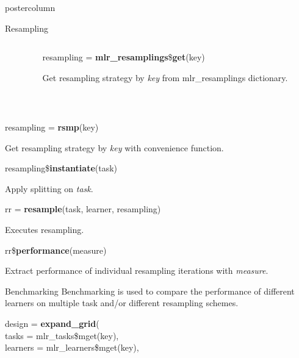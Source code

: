 \documentclass{beamer}
\begin{document}
\begin{frame}[fragile]{}
\begin{columns}
\begin{column}{.245\textwidth}
\begin{beamercolorbox}[center]{postercolumn}
\begin{minipage}{.98\textwidth}
{\begin{myblock}{Resampling}
\begin{minipage}{\textwidth}
\begin{columns}[T]
\begin{column}{0.2\textwidth}
								    \end{column}
								    \begin{column}{0.8\textwidth}
										  \begin{codebox}
										    resampling = \textbf{mlr\_resamplings}\$\textbf{get}(key)
										  \end{codebox}
										  Get resampling strategy by \textit{key} from mlr\_resamplings dictionary.
								    \end{column}
							     \end{columns}
					      	\end{minipage}
						      \\[\baselineskip]
						      \begin{codebox}
						      	resampling = \textbf{rsmp}(key)
						      \end{codebox}
						      Get resampling strategy by \textit{key} with convenience function.
						      \\
						      \begin{codebox}
							      resampling\$\textbf{instantiate}(task)
						      \end{codebox}
						      Apply splitting on \textit{task}.
						      \\
					      	\begin{codebox}
							      rr = \textbf{resample}(task, learner, resampling)
						      \end{codebox}
						      Executes resampling.
						      \\
						      \begin{codebox}
							      rr\$\textbf{performance}(measure)
						      \end{codebox}
						      Extract performance of individual resampling iterations with \textit{measure}.
					      \end{myblock}
				        \begin{myblock}{Benchmarking}
						      Benchmarking is used to compare the performance of different learners on multiple task and/or different resampling schemes.
						    \\
						      \begin{codeboxmultiline}[width=21.95cm]
							      design = \textbf{expand\_grid}(\\
							      \hspace*{1ex}tasks = mlr\_tasks\$mget(key),\\
							      \hspace*{1ex}learners = mlr\_learners\$mget(key),\\

\end{codeboxmultiline}
\end{myblock}}
\end{minipage}
\end{beamercolorbox}
\end{column}
\end{columns}
\end{frame}
\end{document}
